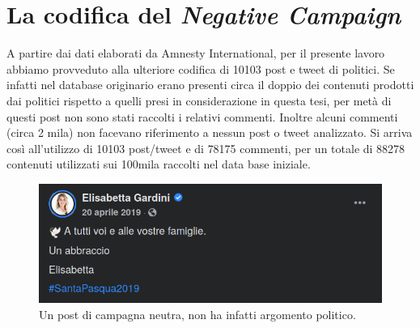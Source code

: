 \section{La codifica del \textit{Negative Campaign}}
A partire dai dati elaborati da Amnesty International, per il presente lavoro abbiamo provveduto alla ulteriore codifica di 10103 post e tweet di politici. Se infatti nel database originario erano presenti circa il doppio dei contenuti prodotti dai politici rispetto a quelli presi in considerazione in questa tesi, per metà di questi post non sono stati raccolti i relativi commenti. Inoltre alcuni commenti (circa 2 mila) non facevano riferimento a nessun post o tweet analizzato. Si arriva così all'utilizzo di 10103 post/tweet e di 78175 commenti, per un totale di 88278 contenuti utilizzati sui 100mila raccolti nel data base iniziale.
\begin{figure}
	\includegraphics[width=\linewidth]{figures/neutro}
	\caption{Un post di campagna neutra, non ha infatti argomento politico.}
	\label{esempi1}
\end{figure}

